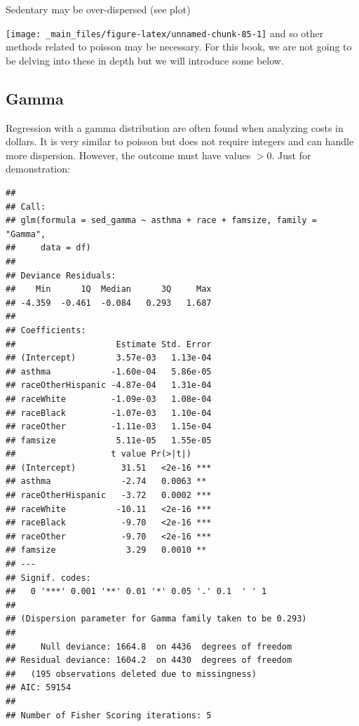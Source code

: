 \documentclass[]{tufte-book}
\newenvironment{Shaded}{}{}
\newcommand{\KeywordTok}[1]{\textcolor[rgb]{0.00,0.44,0.13}{\textbf{#1}}}
\newcommand{\DataTypeTok}[1]{\textcolor[rgb]{0.56,0.13,0.00}{#1}}
\newcommand{\FloatTok}[1]{\textcolor[rgb]{0.25,0.63,0.44}{#1}}
\newcommand{\StringTok}[1]{\textcolor[rgb]{0.25,0.44,0.63}{#1}}
\newcommand{\OperatorTok}[1]{\textcolor[rgb]{0.40,0.40,0.40}{#1}}
\newcommand{\NormalTok}[1]{#1}
\theoremstyle{definition}
\theoremstyle{definition}
\theoremstyle{remark}
\begin{document}
Sedentary may be over-dispersed (see plot)

\texttt{[image: \_main\_files/figure-latex/unnamed-chunk-85-1]} and so
other methods related to poisson may be necessary. For this book, we are
not going to be delving into these in depth but we will introduce some
below.

\subsection*{Gamma}\label{gamma}

Regression with a gamma distribution are often found when analyzing
costs in dollars. It is very similar to poisson but does not require
integers and can handle more dispersion. However, the outcome must have
values \(> 0\). Just for demonstration:

\begin{Shaded}
\end{Shaded}

\begin{verbatim}
## 
## Call:
## glm(formula = sed_gamma ~ asthma + race + famsize, family = "Gamma", 
##     data = df)
## 
## Deviance Residuals: 
##    Min      1Q  Median      3Q     Max  
## -4.359  -0.461  -0.084   0.293   1.687  
## 
## Coefficients:
##                    Estimate Std. Error
## (Intercept)        3.57e-03   1.13e-04
## asthma            -1.60e-04   5.86e-05
## raceOtherHispanic -4.87e-04   1.31e-04
## raceWhite         -1.09e-03   1.08e-04
## raceBlack         -1.07e-03   1.10e-04
## raceOther         -1.11e-03   1.15e-04
## famsize            5.11e-05   1.55e-05
##                   t value Pr(>|t|)    
## (Intercept)         31.51   <2e-16 ***
## asthma              -2.74   0.0063 ** 
## raceOtherHispanic   -3.72   0.0002 ***
## raceWhite          -10.11   <2e-16 ***
## raceBlack           -9.70   <2e-16 ***
## raceOther           -9.70   <2e-16 ***
## famsize              3.29   0.0010 ** 
## ---
## Signif. codes:  
##   0 '***' 0.001 '**' 0.01 '*' 0.05 '.' 0.1  ' ' 1
## 
## (Dispersion parameter for Gamma family taken to be 0.293)
## 
##     Null deviance: 1664.8  on 4436  degrees of freedom
## Residual deviance: 1604.2  on 4430  degrees of freedom
##   (195 observations deleted due to missingness)
## AIC: 59154
## 
## Number of Fisher Scoring iterations: 5
\end{verbatim}
\end{document}
